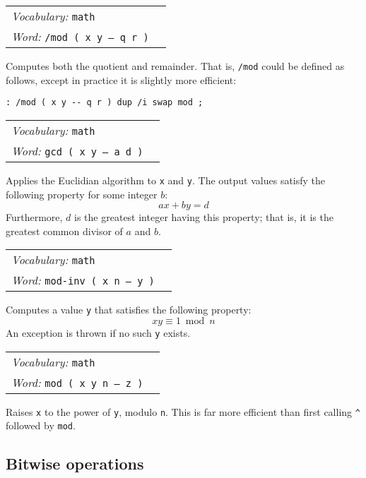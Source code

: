 \documentclass{book}
\newcommand{\hhat}{\symbol{94}}
\newcommand{\vocabulary}[1]{\emph{Vocabulary:} \texttt{#1}&\\}
\newcommand{\ordinaryword}[2]{\index{\texttt{#1}}\emph{Word:} \texttt{#2}&\\}
\newcommand{\wordtable}[1]{


\begin{tabularx}{12cm}{lX}
\hline
#1
\hline
\end{tabularx}

}
\begin{document}
\wordtable{
\vocabulary{math}
\ordinaryword{/mod}{/mod ( x y -- q r )}
}
Computes both the quotient and remainder. That is, \texttt{/mod} could be defined as follows, except in practice it is slightly more efficient:
\begin{verbatim}
: /mod ( x y -- q r ) dup /i swap mod ;
\end{verbatim}
\wordtable{
\vocabulary{math}
\ordinaryword{gcd}{gcd ( x y -- a d )}
}
Applies the Euclidian algorithm to \texttt{x} and \texttt{y}. The output values satisfy the following property for some integer $b$:
$$ax+by=d$$
Furthermore, $d$ is the greatest integer having this property; that is, it is the greatest common divisor of $a$ and $b$.
\wordtable{
\vocabulary{math}
\ordinaryword{mod-inv}{mod-inv ( x n -- y )}
}
Computes a value \texttt{y} that satisfies the following property:
$$xy \equiv 1 \bmod{n}$$ An exception is thrown if no such \texttt{y} exists.
\wordtable{
\vocabulary{math}
\ordinaryword{\hhat{}mod}{\hhat{}mod ( x y n -- z )}
}
Raises \texttt{x} to the power of \texttt{y}, modulo \texttt{n}. This is far more efficient than first calling \texttt{\^{}} followed by \texttt{mod}.

\subsection{Bitwise operations}\label{bitwise}
\end{document}
